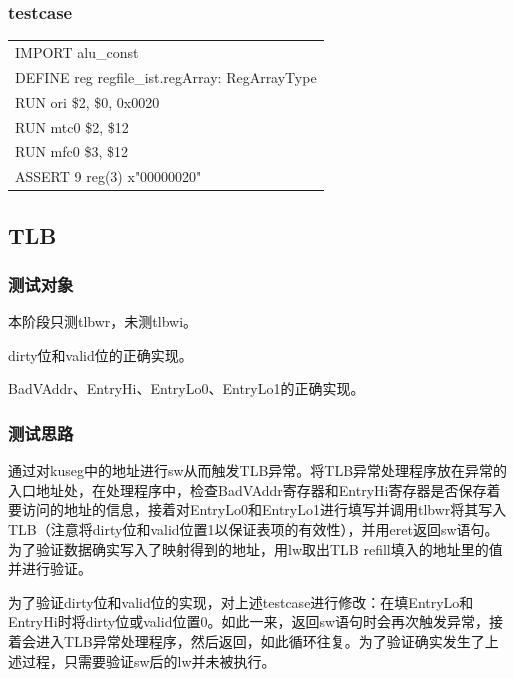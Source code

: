 \documentclass[11pt,utf8]{article}
\begin{document}
{{{\subsubsection{testcase} {
\begin{center}	\begin{longtable}{p{15cm}} \hline
		IMPORT{ }alu\_const\\
		DEFINE{ }reg{ }regfile\_ist.regArray:{ }RegArrayType\\
		RUN{ }ori{ }\$2,{ }\$0,{ }0x0020\\
		RUN{ }mtc0{ }\$2,{ }\$12\\
		RUN{ }mfc0{ }\$3,{ }\$12\\
		ASSERT{ }9{ }reg(3){ }x"00000020"\\
		\hline \end{longtable} \end{center}
}
}

\subsection{TLB} {
\subsubsection{测试对象} {
本阶段只测tlbwr，未测tlbwi。

dirty位和valid位的正确实现。

BadVAddr、EntryHi、EntryLo0、EntryLo1的正确实现。
}
\subsubsection{测试思路} {
通过对kuseg中的地址进行sw从而触发TLB异常。将TLB异常处理程序放在异常的入口地址处，在处理程序中，检查BadVAddr寄存器和EntryHi寄存器是否保存着要访问的地址的信息，接着对EntryLo0和EntryLo1进行填写并调用tlbwr将其写入TLB（注意将dirty位和valid位置1以保证表项的有效性），并用eret返回sw语句。为了验证数据确实写入了映射得到的地址，用lw取出TLB refill填入的地址里的值并进行验证。

为了验证dirty位和valid位的实现，对上述testcase进行修改：在填EntryLo和EntryHi时将dirty位或valid位置0。如此一来，返回sw语句时会再次触发异常，接着会进入TLB异常处理程序，然后返回，如此循环往复。为了验证确实发生了上述过程，只需要验证sw后的lw并未被执行。
}
}}}
\end{document}
